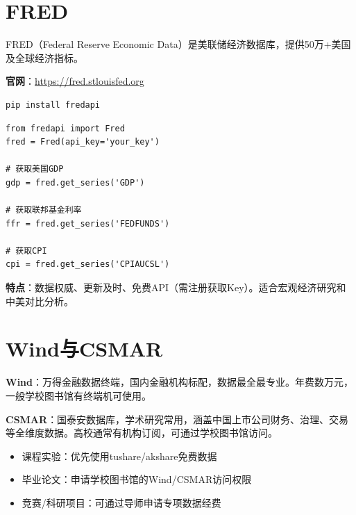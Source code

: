\section{FRED}

FRED（Federal Reserve Economic Data）是美联储经济数据库，提供50万+美国及全球经济指标。

\textbf{官网}：\url{https://fred.stlouisfed.org}

\begin{lstlisting}[style=shell]
pip install fredapi
\end{lstlisting}

\begin{lstlisting}[style=python]
from fredapi import Fred
fred = Fred(api_key='your_key')

# 获取美国GDP
gdp = fred.get_series('GDP')

# 获取联邦基金利率
ffr = fred.get_series('FEDFUNDS')

# 获取CPI
cpi = fred.get_series('CPIAUCSL')
\end{lstlisting}

\textbf{特点}：数据权威、更新及时、免费API（需注册获取Key）。适合宏观经济研究和中美对比分析。

\section{Wind与CSMAR}

\textbf{Wind}：万得金融数据终端，国内金融机构标配，数据最全最专业。年费数万元，一般学校图书馆有终端机可使用。

\textbf{CSMAR}：国泰安数据库，学术研究常用，涵盖中国上市公司财务、治理、交易等全维度数据。高校通常有机构订阅，可通过学校图书馆访问。

\begin{notebox}[学术数据获取建议]
\begin{itemize}[leftmargin=1em]
  \item 课程实验：优先使用tushare/akshare免费数据
  \item 毕业论文：申请学校图书馆的Wind/CSMAR访问权限
  \item 竞赛/科研项目：可通过导师申请专项数据经费
\end{itemize}
\end{notebox}

